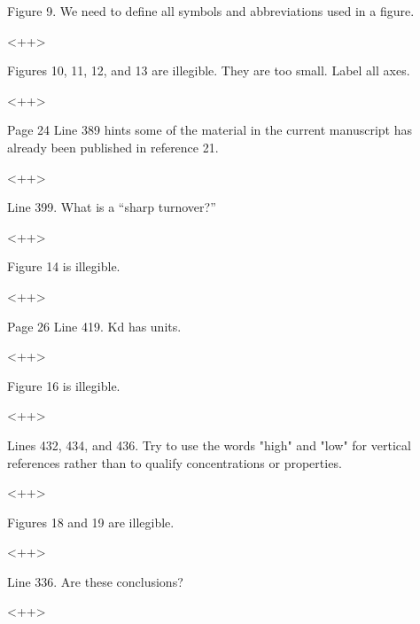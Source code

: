 \documentclass[answers,12pt]{exam}
\begin{document}
\begin{questions}
 

\question Figure 9. We need to define all symbols and abbreviations used in a figure.
\begin{solution}
<++>
\end{solution}

 

\question Figures 10, 11, 12, and 13 are illegible. They are too small. Label all axes.
\begin{solution}
<++>
\end{solution}

 

\question Page 24 Line 389 hints some of the material in the current manuscript has already been published in reference 21.
\begin{solution}
<++>
\end{solution}

 

\question Line 399. What is a “sharp turnover?”
\begin{solution}
<++>
\end{solution}

 

\question Figure 14 is illegible.
\begin{solution}
<++>
\end{solution}

 

\question Page 26 Line 419. Kd has units.
\begin{solution}
<++>
\end{solution}

 

\question Figure 16 is illegible.
\begin{solution}
<++>
\end{solution}

 

\question Lines 432, 434, and 436. Try to use the words "high" and "low" for vertical references rather than to qualify concentrations or properties.
\begin{solution}
<++>
\end{solution}

 

\question Figures 18 and 19 are illegible.
\begin{solution}
<++>
\end{solution}

 

\question Line 336. Are these conclusions?
\begin{solution}
<++>
\end{solution}


\end{questions}
\end{document}
